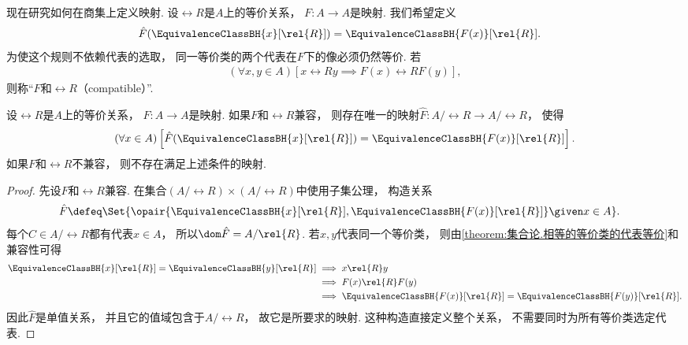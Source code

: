 现在研究如何在商集上定义映射.
设\(\rel{R}\)是\(A\)上的等价关系，
\(F\colon A\to A\)是映射.
我们希望定义
\begin{align*}
    \hat{F}(\EquivalenceClassBH{x}[\rel{R}])
    &=\EquivalenceClassBH{F(x)}[\rel{R}].
\end{align*}
为使这个规则不依赖代表的选取，
同一等价类的两个代表在\(F\)下的像必须仍然等价.
若
\begin{align*}
    (\forall x,y\in A)[x\rel{R}y\implies F(x)\rel{R}F(y)],
\end{align*}
则称“\(F\)和\(\rel{R}\)（compatible）”.

\begin{theorem}\label{theorem:集合论.与等价关系兼容的映射的性质}
    设\(\rel{R}\)是\(A\)上的等价关系，
    \(F\colon A\to A\)是映射.
    如果\(F\)和\(\rel{R}\)兼容，
    则存在唯一的映射\(\hat{F}\colon A/\rel{R}\to A/\rel{R}\)，
    使得
    \begin{align*}
        (\forall x\in A)\left[
        \hat{F}(\EquivalenceClassBH{x}[\rel{R}])
        =\EquivalenceClassBH{F(x)}[\rel{R}]\right].
    \end{align*}
    如果\(F\)和\(\rel{R}\)不兼容，
    则不存在满足上述条件的映射.
    \begin{proof}
        先设\(F\)和\(\rel{R}\)兼容.
        在集合\((A/\rel{R})\times(A/\rel{R})\)中使用子集公理，
        构造关系
        \begin{align*}
            \hat{F}&\defeq\Set{
            \opair{\EquivalenceClassBH{x}[\rel{R}],\EquivalenceClassBH{F(x)}[\rel{R}]}
            \given x\in A}.
        \end{align*}
        每个\(C\in A/\rel{R}\)都有代表\(x\in A\)，
        所以\(\dom\hat{F}=A/\rel{R}\).
        若\(x,y\)代表同一个等价类，
        则由\cref{theorem:集合论.相等的等价类的代表等价}和兼容性可得
        \begin{align*}
            \EquivalenceClassBH{x}[\rel{R}]=\EquivalenceClassBH{y}[\rel{R}]
            &\implies x\rel{R}y\\
            &\implies F(x)\rel{R}F(y)\\
            &\implies\EquivalenceClassBH{F(x)}[\rel{R}]
            =\EquivalenceClassBH{F(y)}[\rel{R}].
        \end{align*}
        因此\(\hat{F}\)是单值关系，
        并且它的值域包含于\(A/\rel{R}\)，
        故它是所要求的映射.
        这种构造直接定义整个关系，
        不需要同时为所有等价类选定代表.


\end{proof}
\end{theorem}
